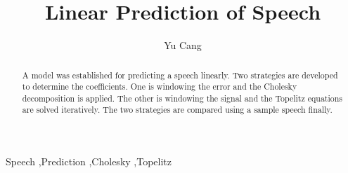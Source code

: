 \documentclass[preprint,12pt]{elsarticle}
\begin{document}
\begin{frontmatter}



\title{Linear Prediction of Speech}


\author{Yu Cang}
\address{Shanghai Jiao Tong University, China}

\begin{abstract}
A model was established for predicting a speech linearly. Two strategies are developed to determine the coefficients. One is windowing the error and the Cholesky decomposition is applied. The other is windowing the signal and the Topelitz equations are solved iteratively. The two strategies are compared using a sample speech finally.
\end{abstract}

\begin{keyword}
Speech \sep Prediction \sep Cholesky \sep Topelitz


\end{keyword}

\end{frontmatter}


\end{document}
